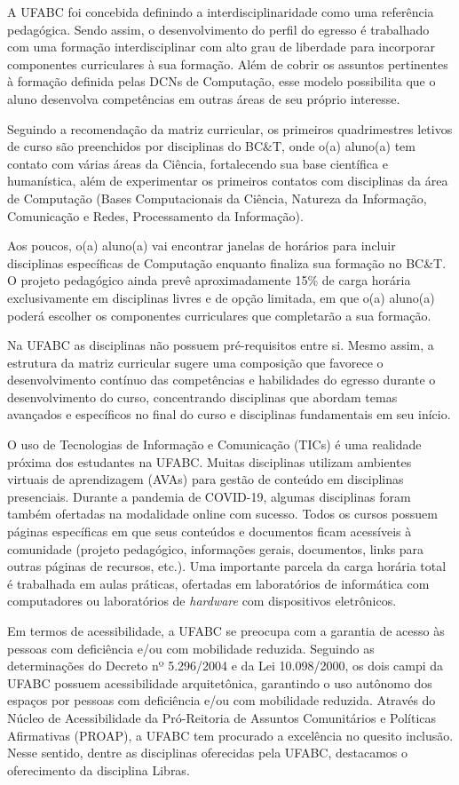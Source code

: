 A UFABC foi concebida definindo a interdisciplinaridade como uma referência
pedagógica.
Sendo assim, o desenvolvimento do perfil do egresso é trabalhado com uma
formação interdisciplinar com alto grau de liberdade para incorporar
componentes curriculares à sua formação.
Além de cobrir os assuntos pertinentes à formação definida pelas DCNs de
Computação, esse modelo possibilita que o aluno desenvolva competências em
outras áreas de seu próprio interesse.

Seguindo a recomendação da matriz curricular, os primeiros quadrimestres
letivos de curso são preenchidos por disciplinas do BC\&T, onde o(a) aluno(a)
tem contato com várias áreas da Ciência, fortalecendo sua base científica e
humanística, além de experimentar os primeiros contatos com disciplinas da área
de Computação (Bases Computacionais da Ciência, Natureza da Informação,
Comunicação e Redes, Processamento da Informação).

Aos poucos, o(a) aluno(a) vai encontrar janelas de horários para incluir
disciplinas específicas de Computação enquanto finaliza sua formação no BC\&T.
O projeto pedagógico ainda prevê aproximadamente 15\% de carga horária exclusivamente 
em disciplinas livres e de opção limitada, em que o(a) aluno(a) poderá escolher os componentes
curriculares que completarão a sua formação.

Na UFABC as disciplinas não possuem pré-requisitos entre si.
Mesmo assim, a estrutura da matriz curricular sugere uma composição que
favorece o desenvolvimento contínuo das competências e habilidades do egresso
durante o desenvolvimento do curso, concentrando disciplinas que abordam temas
avançados e específicos no final do curso e disciplinas fundamentais em seu
início.

O uso de Tecnologias de Informação e Comunicação (TICs) é uma realidade próxima
dos estudantes na UFABC.
Muitas disciplinas utilizam ambientes virtuais de aprendizagem (AVAs) para
gestão de conteúdo em disciplinas presenciais.
Durante a pandemia de COVID-19, algumas disciplinas foram também ofertadas na
modalidade online com sucesso.
Todos os cursos possuem páginas específicas em que seus conteúdos e documentos
ficam acessíveis à comunidade (projeto pedagógico, informações gerais,
documentos, links para outras páginas de recursos, etc.).
Uma importante parcela da carga horária total é trabalhada em aulas práticas,
ofertadas em laboratórios de informática com computadores ou laboratórios de
{\it hardware} com dispositivos eletrônicos.

Em termos de acessibilidade, a UFABC se preocupa com a garantia de acesso
às pessoas com deficiência e/ou com mobilidade reduzida. 
Seguindo as determinações do Decreto nº 5.296/2004 e da Lei 10.098/2000,
os dois campi da UFABC possuem acessibilidade arquitetônica, garantindo o uso
autônomo dos espaços por pessoas com deficiência e/ou com mobilidade reduzida.
Através do Núcleo de Acessibilidade da Pró-Reitoria de Assuntos Comunitários e
Políticas Afirmativas (PROAP), a UFABC tem procurado a excelência no quesito
inclusão.
Nesse sentido, dentre as disciplinas oferecidas pela UFABC, destacamos o
oferecimento da disciplina Libras.

